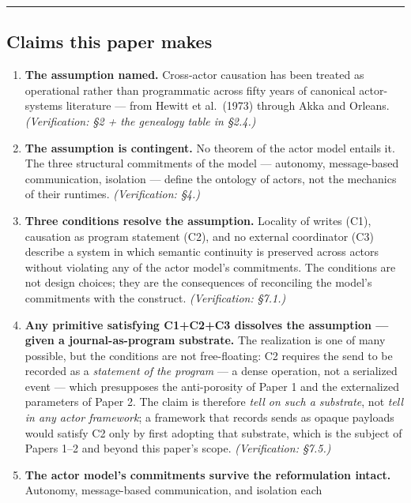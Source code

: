 \documentclass[
]{article}
\begin{document}
\begin{center}\rule{0.5\linewidth}{0.5pt}\end{center}

\subsection{Claims this paper makes}\label{claims-this-paper-makes}

\begin{enumerate}
\def\labelenumi{\arabic{enumi}.}
\item
  \textbf{The assumption named.} Cross-actor causation has been treated
  as operational rather than programmatic across fifty years of
  canonical actor-systems literature --- from Hewitt et al.~(1973)
  through Akka and Orleans. \emph{(Verification: §2 + the genealogy
  table in §2.4.)}
\item
  \textbf{The assumption is contingent.} No theorem of the actor model
  entails it. The three structural commitments of the model ---
  autonomy, message-based communication, isolation --- define the
  ontology of actors, not the mechanics of their runtimes.
  \emph{(Verification: §4.)}
\item
  \textbf{Three conditions resolve the assumption.} Locality of writes
  (C1), causation as program statement (C2), and no external coordinator
  (C3) describe a system in which semantic continuity is preserved
  across actors without violating any of the actor model's commitments.
  The conditions are not design choices; they are the consequences of
  reconciling the model's commitments with the construct.
  \emph{(Verification: §7.1.)}
\item
  \textbf{Any primitive satisfying C1+C2+C3 dissolves the assumption ---
  given a journal-as-program substrate.} The realization is one of many
  possible, but the conditions are not free-floating: C2 requires the
  send to be recorded as a \emph{statement of the program} --- a dense
  operation, not a serialized event --- which presupposes the
  anti-porosity of Paper 1 and the externalized parameters of Paper 2.
  The claim is therefore \emph{tell on such a substrate}, not \emph{tell
  in any actor framework}; a framework that records sends as opaque
  payloads would satisfy C2 only by first adopting that substrate, which
  is the subject of Papers 1--2 and beyond this paper's scope.
  \emph{(Verification: §7.5.)}
\item
  \textbf{The actor model's commitments survive the reformulation
  intact.} Autonomy, message-based communication, and isolation each

\end{enumerate}
\end{document}

